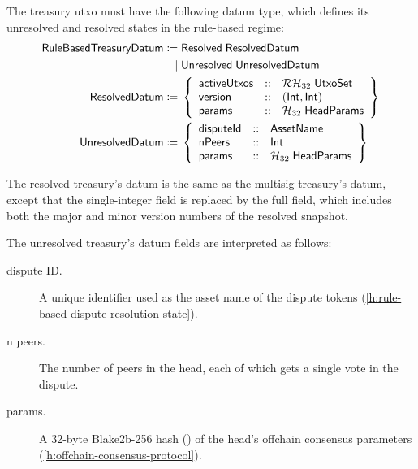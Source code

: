 \documentclass[../hydrozoa.tex]{subfiles}
\begin{document}
The treasury utxo must have the following datum type, which defines its unresolved and resolved states in the rule-based regime:
\begin{equation*}
\begin{split}
  \mathsf{RuleBasedTreasuryDatum} \coloneq&\;
    \mathsf{Resolved} \; \mathsf{ResolvedDatum} \\\mid&\;
    \mathsf{Unresolved} \; \mathsf{UnresolvedDatum} \\
  \mathsf{ResolvedDatum} \coloneq&\;\left\{
    \begin{array}{lll}
      \mathsf{activeUtxos}  &::& \mathcal{RH}_{32} \; \mathsf{UtxoSet} \\
      \mathsf{version} &::& (\mathsf{Int}, \mathsf{Int}) \\
      \mathsf{params} &::& \mathcal{H}_{32} \; \mathsf{HeadParams}
    \end{array}\right\} \\
  \mathsf{UnresolvedDatum} \coloneq&\;\left\{
    \begin{array}{lll}
      \mathsf{disputeId} &::& \mathsf{AssetName} \\
      \mathsf{nPeers} &::& \mathsf{Int} \\
      \mathsf{params} &::& \mathcal{H}_{32} \; \mathsf{HeadParams}
    \end{array}\right\}
\end{split}
\end{equation*}

The resolved treasury's datum is the same as the multisig treasury's datum, except that the single-integer  field is replaced by the full  field, which includes both the major and minor version numbers of the resolved snapshot.

The unresolved treasury's datum fields are interpreted as follows:
\begin{description}
  \item[dispute ID.] A unique identifier used as the asset name of the dispute tokens (\cref{h:rule-based-dispute-resolution-state}).
  \item[n peers.] The number of peers in the head, each of which gets a single vote in the dispute.
  \item[params.] A 32-byte Blake2b-256 hash () of the head's offchain consensus parameters (\cref{h:offchain-consensus-protocol}).
\end{description}
\end{document}
